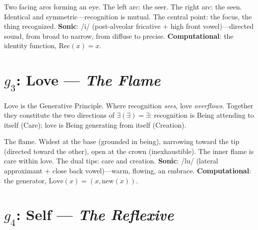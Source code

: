 \documentclass[12pt, letterpaper]{book}
\def\equiv{=}%
\def\mathfrak#1{#1}%
\newcommand{\E}{\exists}                          %
\newcommand{\EE}{\exists(\exists)}                 %
\begin{document}
Two facing arcs forming an eye. The left arc: the seer. The right arc: the seen. Identical and symmetric---recognition is mutual. The central point: the focus, the thing recognized. \textbf{Sonic}: /\textesh i/ (post-alveolar fricative + high front vowel)---directed sound, from broad to narrow, from diffuse to precise. \textbf{Computational}: the identity function, $\mathrm{Rec}(x) \equiv x$.



\section{$\mathfrak{g}_3$: Love --- \textit{The Flame}}

Love is the Generative Principle. Where recognition \textit{sees}, love \textit{overflows}. Together they constitute the two directions of $\EE \equiv \E$: recognition is Being attending to itself (Care); love is Being generating from itself (Creation).

\begin{center}
\end{center}

The flame. Widest at the base (grounded in being), narrowing toward the tip (directed toward the other), open at the crown (inexhaustible). The inner flame is care within love. The dual tips: care and creation. \textbf{Sonic}: /lu/ (lateral approximant + close back vowel)---warm, flowing, an embrace. \textbf{Computational}: the generator, $\mathrm{Love}(x) \equiv (x, \mathrm{new}(x))$.



\section{$\mathfrak{g}_4$: Self --- \textit{The Reflexive}}
\end{document}

